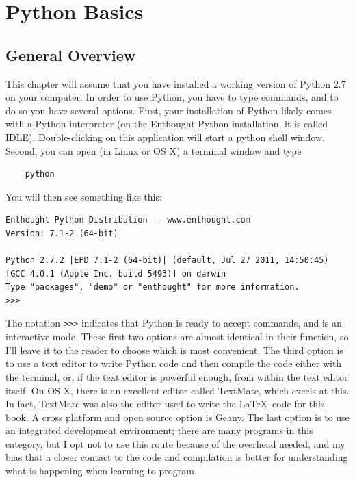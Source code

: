 %
%
%
\chapter{Python Basics}
\label{basics} %
\section{General Overview}
\label{sec:overview}
This chapter will assume that you have installed a working version of Python 2.7 on your computer. In order to use Python, you have to type commands, and to do so you have several options. First, your installation of Python likely comes with a Python interpreter (on the Enthought Python installation, it is called IDLE). Double-clicking on this application will start a python shell window. Second, you can open (in Linux or OS X) a terminal window and type
\begin{verbatim}
	python
\end{verbatim}
You will then see something like this:
\small\begin{verbatim}
Enthought Python Distribution -- www.enthought.com
Version: 7.1-2 (64-bit)

Python 2.7.2 |EPD 7.1-2 (64-bit)| (default, Jul 27 2011, 14:50:45) 
[GCC 4.0.1 (Apple Inc. build 5493)] on darwin
Type "packages", "demo" or "enthought" for more information.
>>> 
\end{verbatim}\normalsize
The notation \verb">>>" indicates that Python is ready to accept commands, and is an interactive mode.
These first two options are almost identical in their function, so I'll leave it to the reader to choose which is most convenient.
The third option is to use a text editor to write Python code and then compile the code either with the terminal, or, if the text editor is powerful enough, from within the text editor itself. On OS X, there is an excellent editor called TextMate, which excels at this. In fact, TextMate was also the editor used to write the \LaTeX\ code for this book. A cross platform and open source option is Geany. The last option is to use an integrated development environment; there are many programs in this category, but I opt not to use this route because of the overhead needed, and my bias that a closer contact to the code and compilation is better for understanding what is happening when learning to program.

